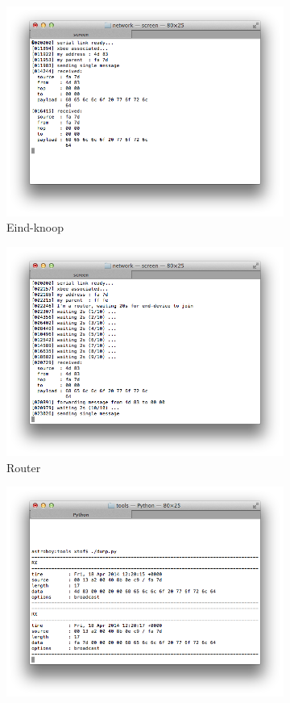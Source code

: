 \begin{figure}[ht]
\centering
\begin{subfigure}{.67\linewidth}
  \centering
  \includegraphics[width=.9\linewidth]{../src/demo/network/end-device.png}
  \caption{Eind-knoop}
  \label{fig:virtual-mesh-end-device}
\end{subfigure}
\begin{subfigure}{.67\linewidth}
  \centering
  \includegraphics[width=.9\linewidth]{../src/demo/network/router.png}
  \caption{Router}
  \label{fig:virtual-mesh-router}
\end{subfigure}
\begin{subfigure}{.67\linewidth}
  \centering
  \includegraphics[width=.9\linewidth]{../src/demo/network/coordinator.png}

\end{subfigure}
\end{figure}
